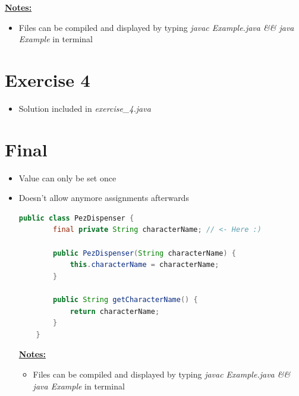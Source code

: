 \documentclass[12pt]{article}
\begin{document}
    \bigskip

    \underline{\textbf{Notes:}}

    \bigskip

    \begin{itemize}
        \item Files can be compiled and displayed by typing \textit{javac Example.java \&\& java Example}
        in terminal
    \end{itemize}

\bigskip

\section{Exercise 4}

\bigskip

\begin{itemize}
    \item Solution included in \textit{exercise\_4.java}
\end{itemize}

\bigskip

\section{Final}

\bigskip

\begin{itemize}
    \item Value can only be set once
    \item Doesn't allow anymore assignments afterwards

    \begin{lstlisting}[language=Java,caption={lesson\_11/PezDispenser.java}]
    public class PezDispenser {
        final private String characterName; // <- Here :)

        public PezDispenser(String characterName) {
            this.characterName = characterName;
        }

        public String getCharacterName() {
            return characterName;
        }
    }
    \end{lstlisting}

    \bigskip

    \underline{\textbf{Notes:}}

    \bigskip

    \begin{itemize}
        \item Files can be compiled and displayed by typing \textit{javac Example.java \&\& java Example}
        in terminal
    \end{itemize}
\end{itemize}
\end{document}
